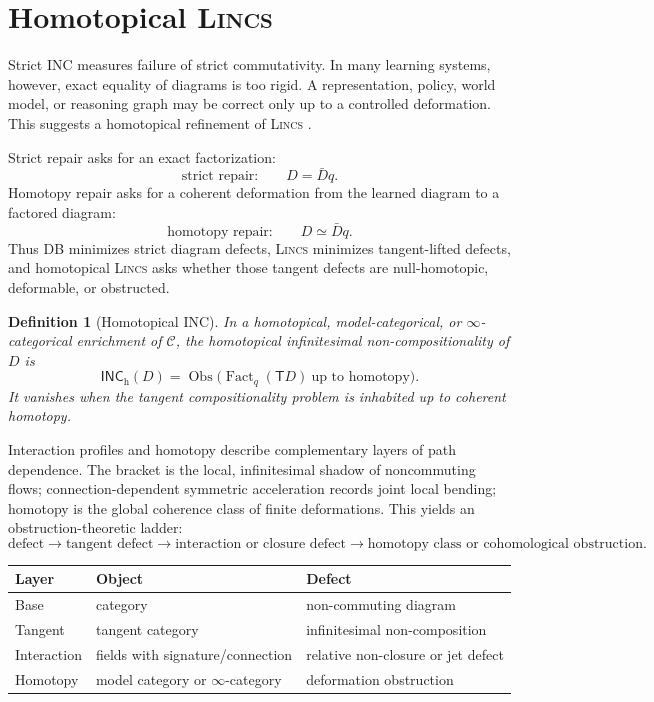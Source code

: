 \documentclass{article}
\newtheorem{definition}{Definition}
\newcommand{\C}{\mathcal{C}}
\newcommand{\T}{\mathsf{T}}
\newcommand{\INC}{\mathsf{INC}}
\newcommand{\Fact}{\operatorname{Fact}}
\newcommand{\Obs}{\operatorname{Obs}}
\begin{document}
\section{Homotopical \textsc{Lincs}  }

Strict INC measures failure of strict commutativity. In many learning systems, however, exact equality of diagrams is too rigid. A representation, policy, world model, or reasoning graph may be correct only up to a controlled deformation. This suggests a homotopical refinement of \textsc{Lincs}  .

Strict repair asks for an exact factorization:
\[
\text{strict repair:}\qquad D=\bar Dq.
\]
Homotopy repair asks for a coherent deformation from the learned diagram to a factored diagram:
\[
\text{homotopy repair:}\qquad D\simeq \bar Dq.
\]
Thus DB minimizes strict diagram defects, \textsc{Lincs}   minimizes tangent-lifted defects, and homotopical \textsc{Lincs}   asks whether those tangent defects are null-homotopic, deformable, or obstructed.

\begin{definition}[Homotopical INC]
In a homotopical, model-categorical, or \(\infty\)-categorical enrichment of \(\C\), the homotopical infinitesimal non-compositionality of \(D\) is
\[
\INC_{\mathrm h}(D)
  =
  \Obs\big(\Fact_q(\T D)\ \text{up to homotopy}\big).
\]
It vanishes when the tangent compositionality problem is inhabited up to coherent homotopy.
\end{definition}

Interaction profiles and homotopy describe complementary layers of path dependence. The bracket is the local, infinitesimal shadow of noncommuting flows; connection-dependent symmetric acceleration records joint local bending; homotopy is the global coherence class of finite deformations. This yields an obstruction-theoretic ladder:
\[
\text{defect}
\to
\text{tangent defect}
\to
\text{interaction or closure defect}
\to
\text{homotopy class or cohomological obstruction}.
\]

\begin{center}
\begin{tabular}{lll}
\toprule
Layer & Object & Defect\\
\midrule
Base & category & non-commuting diagram\\
Tangent & tangent category & infinitesimal non-composition\\
Interaction & fields with signature/connection & relative non-closure or jet defect\\
Homotopy & model category or \(\infty\)-category & deformation obstruction\\
\bottomrule
\end{tabular}
\end{center}
\end{document}
